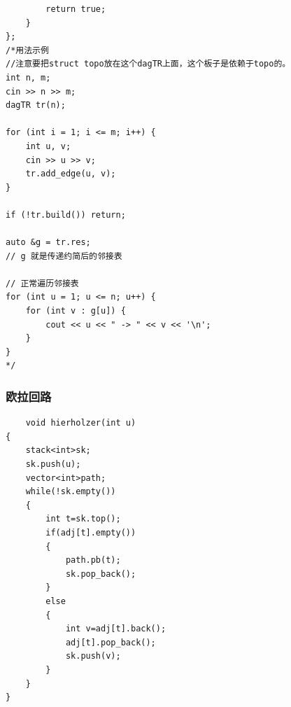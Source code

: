 \documentclass[10pt, a4paper, twocolumn]{article} %
\begin{document}
\begin{lstlisting}
        return true;
    }
};
/*用法示例
//注意要把struct topo放在这个dagTR上面，这个板子是依赖于topo的。
int n, m;
cin >> n >> m;
dagTR tr(n);

for (int i = 1; i <= m; i++) {
    int u, v;
    cin >> u >> v;
    tr.add_edge(u, v);
}

if (!tr.build()) return;

auto &g = tr.res;
// g 就是传递约简后的邻接表

// 正常遍历邻接表 
for (int u = 1; u <= n; u++) {
    for (int v : g[u]) {
        cout << u << " -> " << v << '\n';
    }
}
*/
    \end{lstlisting}
     \subsubsection{欧拉回路}
    \begin{lstlisting}
    void hierholzer(int u)
{
    stack<int>sk;
    sk.push(u);
    vector<int>path;
    while(!sk.empty())
    {
        int t=sk.top();
        if(adj[t].empty())
        {
            path.pb(t);
            sk.pop_back();
        }
        else
        {
            int v=adj[t].back();
            adj[t].pop_back();
            sk.push(v);
        }
    }
}
    \end{lstlisting}
\end{document}
